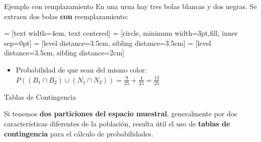 \documentclass[11pt,handout]{beamer}
\begin{document}
\begin{frame}{Ejemplo con remplazamiento}
En una urna hay tres bolas blancas y dos negras. Se extraen dos bolas \textbf{con} reemplazamiento:

 = [text width=4em, text centered]
 = [circle, minimum width=3pt,fill, inner sep=0pt]
 = [level distance=3.5cm, sibling distance=3.5cm]
 = [level distance=3.5cm, sibling distance=2cm]


\pause
\begin{itemize}
\item Probabilidad de que sean del mismo color: \\
\pause
$P((B_1\cap B_2)\cup (N_1\cap N_2))=\frac{9}{25}+\frac{4}{25}=\frac{13}{25}$
\end{itemize}

\end{frame}

\begin{frame}{Tablas de Contingencia}
\begin{block}{}
Si tenemos \textbf{dos particiones del espacio muestral}, generalmente por dos características diferentes de la población, resulta útil el uso de \textbf{tablas de contingencia} para el cálculo de probabilidades.
\end{block}
\end{frame}
\end{document}
